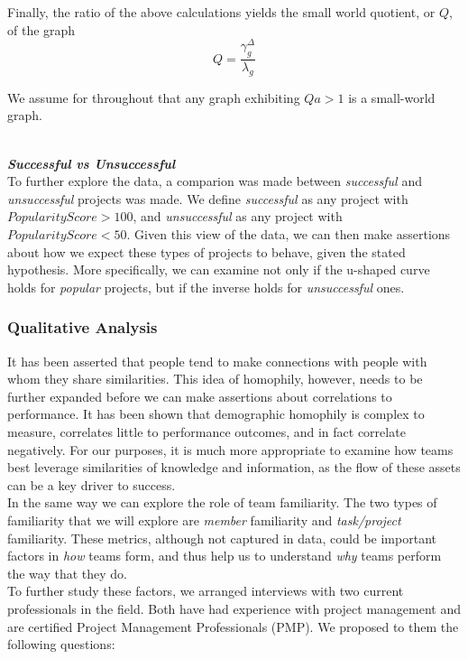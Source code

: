 \documentclass{proc}
\begin{document}
Finally, the ratio of the above calculations yields the small world quotient, or $Q$, of the graph
\[Q = \frac{\gamma^{\Delta}_g }{\lambda_g} \]

We assume for throughout that any graph exhibiting $Qa > 1$ is a small-world graph.

\noindent\\\textit{\textbf{Successful vs Unsuccessful}}\\
To further explore the data, a comparion was made between \textit{successful} and \textit{unsuccessful} projects was made. We define \textit{successful} as any project with {$PopularityScore > 100$}, and \textit{unsuccessful} as any project with {$PopularityScore < 50$}. Given this view of the data, we can then make assertions about how we expect these types of projects to behave, given the stated hypothesis. More specifically, we can examine not only if the u-shaped curve holds for \textit{popular} projects, but if the inverse holds for \textit{unsuccessful} ones.


\subsubsection{Qualitative Analysis}
It has been asserted that people tend to make connections with people with whom they share similarities\cite{mcpherson2001birds}. This idea of homophily, however, needs to be further expanded before we can make assertions about correlations to performance. It has been shown that demographic homophily is complex to measure, correlates little to performance outcomes, and in fact correlate negatively\cite{reagans2004make,lawrence1997perspective}. For our purposes, it is much more appropriate to examine how teams best leverage similarities of knowledge and information, as the flow of these assets can be a key driver to success\cite{nissen2002extended}.\\
In the same way we can explore the role of team familiarity. The two types of familiarity that we will explore are \textit{member} familiarity and \textit{task/project} familiarity\cite{harrison2003time}. These metrics, although not captured in data, could be important factors in \textit{how} teams form, and thus help us to understand \textit{why} teams perform the way that they do.\\

To further study these factors, we arranged interviews with two current professionals in the field. Both have had experience with project management and are certified Project Management Professionals (PMP)\textregistered. We proposed to them the following questions:
\end{document}
